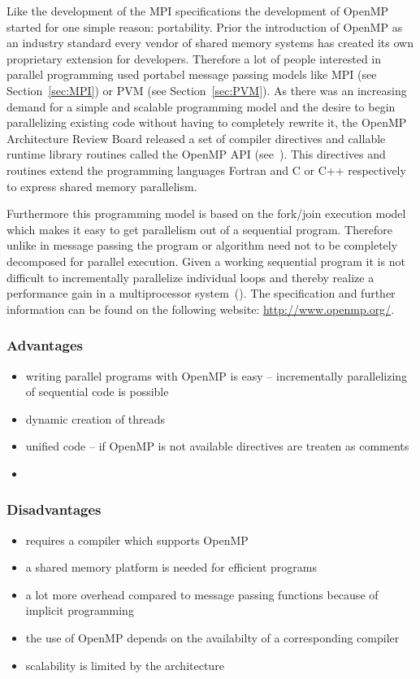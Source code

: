 Like the development of the MPI specifications the development
of OpenMP started for one simple reason: portability. Prior the
introduction of OpenMP as an industry standard every vendor of shared
memory systems has created its own proprietary extension for
developers. Therefore a lot of people interested in parallel
programming used portabel message passing models like MPI (see
Section~\ref{sec:MPI}) or PVM (see Section~\ref{sec:PVM}). As there
was an increasing demand for a simple and scalable programming model and
the desire to begin parallelizing existing code without having to
completely rewrite it, the OpenMP Architecture Review Board released a
set of compiler directives and callable runtime library routines
called the OpenMP API (see~\cite{openMP05}). This directives and
routines extend the
programming languages Fortran and C or C++ respectively to express
shared memory parallelism.

Furthermore this programming model is based on the fork/join execution
model which makes it easy to get parallelism out of a sequential
program. Therefore unlike in message passing the program or algorithm
need not to be completely decomposed for parallel execution. Given a
working sequential program it is not difficult to incrementally
parallelize individual loops and thereby realize a performance gain in
a multiprocessor system~(\cite{dagum1997opi}). The specification and
further information can be found on the following website:
\url{http://www.openmp.org/}.

\subsubsection{Advantages}

\begin{itemize}
\item writing parallel programs with OpenMP is easy -- incrementally
  parallelizing of sequential code is possible
\item dynamic creation of threads
\item unified code -- if OpenMP is not available directives are
  treaten as comments 
\item 
\end{itemize}

\subsubsection{Disadvantages}

\begin{itemize}
\item requires a compiler which supports OpenMP
\item a shared memory platform is needed for efficient programs
\item a lot more overhead compared to message passing functions because
  of implicit programming
\item the use of OpenMP depends on the availabilty of a corresponding
  compiler
\item scalability is limited by the architecture

\end{itemize}


